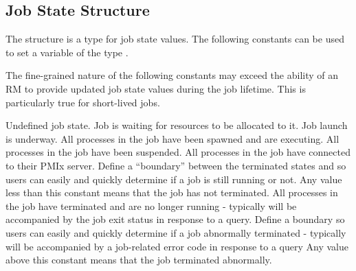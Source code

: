 
\begin{arglist}
\end{arglist}


\subsection{Job State Structure}
\label{api:struct:jobstate}

The  structure is a  type for job state values. The following constants can be used to set a variable of the type .

\adviceuserstart
The fine-grained nature of the following constants may exceed the ability of an \ac{RM} to provide updated job state values during the job lifetime. This is particularly true for short-lived jobs.
\adviceuserend

\begin{constantdesc}
%
Undefined job state.
%
Job is waiting for resources to be allocated to it.
%
Job launch is underway.
%
All processes in the job have been spawned and are executing.
%
All processes in the job have been suspended.
%
All processes in the job have connected to their \ac{PMIx} server.
%
Define a ``boundary'' between the terminated states and  so users can easily and quickly determine if a job is still running or not.
Any value less than this constant means that the job has not terminated.
%
All processes in the job have terminated and are no longer running - typically will be accompanied by the job exit status in response to a query.
%
Define a boundary so users can easily and quickly determine if a job abnormally terminated - typically will be accompanied by a job-related error code in response to a query
Any value above this constant means that the job terminated abnormally.
%
\end{constantdesc}


